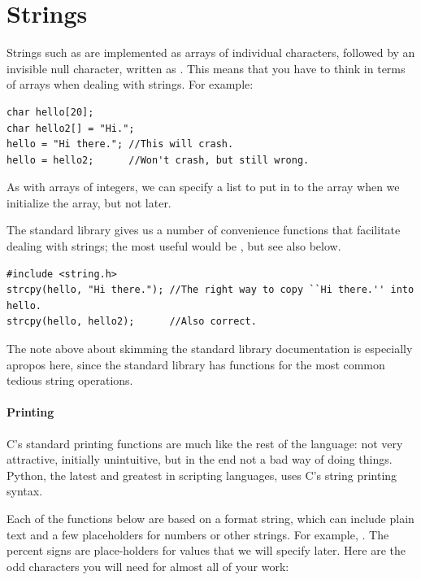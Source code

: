 \documentclass[12pt]{article}
\makeatletter
\def\ind#1{\index{#1}#1}
\def\ttind#1{\index{#1@\cinline{#1}}\cinline{#1}}
\makeatother
\begin{document}
\section{Strings} 

Strings such as  are implemented as arrays of individual characters, followed by an invisible
null character, written as . This means that you have to think in terms of arrays when dealing
with strings. For example:
\begin{lstlisting}
char hello[20];
char hello2[] = "Hi.";
hello = "Hi there."; //This will crash.
hello = hello2;      //Won't crash, but still wrong.
\end{lstlisting}

As with arrays of integers, we can specify a list to put in to the array when we initialize the array, but
not later.

The standard library gives us a number of convenience functions that facilitate dealing with strings; the
most useful would be \ttind{strcpy}, but see also  below.
\begin{lstlisting}
#include <string.h>
strcpy(hello, "Hi there."); //The right way to copy ``Hi there.'' into hello.
strcpy(hello, hello2);      //Also correct.
\end{lstlisting}

The note above about skimming the standard library documentation is especially apropos here, since the
standard library has functions for the most common tedious string operations.

\paragraph{Printing}
\label{printf}
C's standard printing functions are much like the rest of the language:
not very attractive, initially unintuitive, but in the end not a bad
way of doing things. \ind{Python}, the latest and greatest in scripting
languages, uses C's string printing syntax.

Each of the functions below are based on a format string, which
can include plain text and a few placeholders for numbers or
other strings. For example, . The percent signs are place-holders for values
that we will specify later. Here are the odd characters you will need
for almost all of your work:
\end{document}
